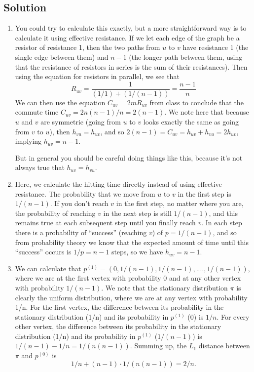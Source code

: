 \documentclass{article}
\begin{document}
\subsection*{Solution}
 \begin{enumerate}[label=(\alph*)]
    \item You could try to calculate this exactly, but a more straightforward way is to calculate it using effective resistance. If we let each edge of the graph be a resistor of resistance 1, then the two paths from $u$ to $v$ have resistance $1$ (the single edge between them) and $n-1$ (the longer path between them, using that the resistance of resistors in series is the sum of their resistances). Then using the equation for resistors in parallel, we see that 
    $$R_{uv} = \frac{1}{(1/1) + (1/(n-1))} = \frac{n-1}{n}$$
    We can then use the equation $C_{uv} = 2m R_{uv}$ from class to conclude that the commute time $C_{uv} = 2n (n-1)/n = 2(n-1)$. 
    We note here that because $u$ and $v$ are symmetric (going from $u$ to $v$ looks exactly the same as going from $v$ to $u$), then $h_{vu} = h_{uv}$, and so $2(n-1) = C_{uv} = h_{uv} + h_{vu} = 2 h_{uv}$, implying $h_{uv} = n-1$. 

   \vspace{3mm}
    But in general you should be careful doing things like this, because it's not always true that $h_{uv} = h_{vu}$.
    \item Here, we calculate the hitting time directly instead of using effective resistance. The probability that we move from $u$ to $v$ in the first step is $1/(n-1)$. If you don't reach $v$ in the first step, no matter where you are, the probability of reaching $v$ in the next step is still $1/(n-1)$, and this remains true at each subsequent step until you finally reach $v$. In each step there is a probability of ``success'' (reaching $v$) of $p=1/(n-1)$, and so from probability theory we know that the expected amount of time until this ``success'' occurs is $1/ p= n-1$ steps, so we have $h_{uv} = n-1$. 
    \item We can calculate that $p^{(1)} = (0, 1/(n-1), 1/(n-1),...., 1/(n-1))$, where we are at the first vertex with probability 0 and at any other vertex with probability $1/(n-1)$. We note that the stationary distribution $\pi$ is clearly the uniform distribution, where we are at any vertex with probability 1/n. For the first vertex, the difference between its probability in the stationary distribution (1/n) and its probability in $p^{(1)}$   (0) is $1/n$. For every other vertex, the difference between its probability in the stationary distribution (1/n) and its probability in $p^{(1)}$   ($1/(n-1)$) is $1/(n-1) - 1/n = 1/(n(n-1))$. Summing up, the $L_1$ distance between $\pi$ and $p^{(0)}$ is $$1/n + (n-1) \cdot 1/(n(n-1)) = 2/n.$$


\end{enumerate}
\end{document}
